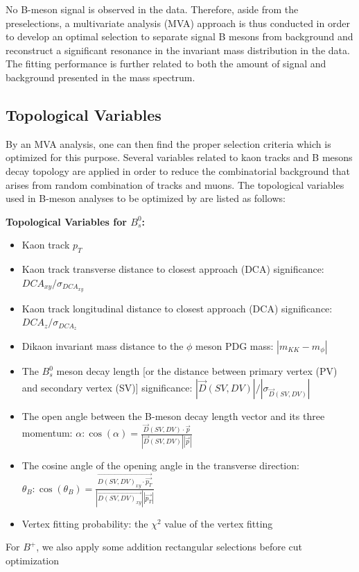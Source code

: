 No B-meson signal is observed in the data. Therefore, aside from the preselections, a multivariate analysis (MVA) approach \cite{MVARef} is thus conducted in order to develop an optimal selection to separate signal B mesons from background and reconstruct a significant resonance in the invariant mass distribution in the data. The fitting performance is further related to both the amount of signal and background presented in the mass spectrum. 


\subsection{Topological Variables}


By an MVA analysis, one can then find the proper selection criteria which is optimized for this purpose. Several variables related to kaon tracks and B mesons decay topology are applied in order to reduce the combinatorial background that arises from random combination of tracks and muons. The topological variables used in B-meson analyses to be optimized by  are listed as follows:

\textbf{Topological Variables for $B^0_s$:}
\begin{itemize}
\item Kaon track $p_T$
\item Kaon track transverse distance to closest approach (DCA) significance: $DCA_{xy}/\sigma_{DCA_{xy}}$ 
\item Kaon track longitudinal distance to closest approach (DCA) significance: $DCA_{z}/\sigma_{DCA_{z}}$
\item Dikaon invariant mass distance to the $\phi$ meson PDG mass: $|m_{KK} - m_{\phi}|$
\item The $B^0_s$ meson decay length [or the distance between primary vertex (PV) and secondary vertex (SV)] significance: $|\vec{D}(SV,DV)|/|\sigma_{\vec{D}(SV,DV)}|$
\item The open angle between the B-meson decay length vector and its three momentum: $\alpha: \cos(\alpha) = \frac{\vec{D}(SV,DV) \cdot \vec{p}}{|\vec{D}(SV,DV)||\vec{p}|}$
\item The cosine angle of the opening angle in the transverse direction:  $\theta_B: \cos(\theta_B) = \frac{\vec{D(SV,DV)_{xy} \cdot \vec{p_T}}}{|\vec{D(SV,DV)_{xy}}||\vec{p_T}|}$
\item Vertex fitting probability: the $\chi^2$ value of the vertex fitting
\end{itemize}

For $B^+$, we also apply some addition rectangular selections before cut optimization

